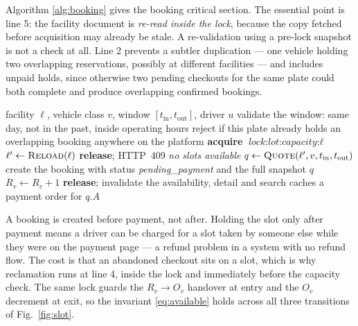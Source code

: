\documentclass[journal,onecolumn,11pt]{IEEEtran}
\begin{document}
Algorithm \ref{alg:booking} gives the booking critical section. The essential
point is line 5: the facility document is \emph{re-read inside the lock},
because the copy fetched before acquisition may already be stale. A
re-validation using a pre-lock snapshot is not a check at all. Line 2 prevents
a subtler duplication --- one vehicle holding two overlapping reservations,
possibly at different facilities --- and includes unpaid holds, since otherwise
two pending checkouts for the same plate could both complete and produce
overlapping confirmed bookings.

\begin{algorithm}[!t]
\caption{Reservation under the capacity lock}
\label{alg:booking}
\small
\begin{algorithmic}[1]
\Require facility $\ell$, vehicle class $v$, window $[t_{\text{in}},t_{\text{out}}]$, driver $u$
\State validate the window: same day, not in the past, inside operating hours
\State reject if this plate already holds an overlapping booking anywhere on the platform
\State \textbf{acquire} $\textit{lock:lot:capacity:}\ell$
\State {}
\State $\ell' \gets \Call{Reload}{\ell}$
  \State \textbf{release}; \Return HTTP~409 \textit{no slots available}
\EndIf
\State $q \gets \Call{Quote}{\ell', v, t_{\text{in}}, t_{\text{out}}}$
\State create the booking with status \textit{pending\_payment} and the full snapshot $q$
\State $R_v \gets R_v + 1$
\State \textbf{release}; invalidate the availability, detail and search caches
\State \Return a payment order for $q.A$
\end{algorithmic}
\end{algorithm}

A booking is created before payment, not after. Holding the slot only after
payment means a driver can be charged for a slot taken by someone else while
they were on the payment page --- a refund problem in a system with no refund
flow. The cost is that an abandoned checkout sits on a slot, which is why
reclamation runs at line 4, inside the lock and immediately before the capacity
check. The same lock guards the $R_v \to O_v$ handover at entry and the $O_v$
decrement at exit, so the invariant \eqref{eq:available} holds across all three
transitions of Fig.~\ref{fig:slot}.
\end{document}
